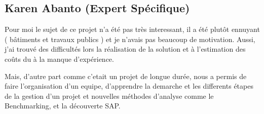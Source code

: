 \subsection{Karen Abanto (Expert Spécifique)}

Pour moi le sujet de ce projet n'a été pas très interessant, il a été plutôt
 ennuyant ( bâtiments et travaux publics )
et je n'avais pas beaucoup de motivation. Aussi, j'ai trouvé des 
difficultés lors la réalisation de la solution 
et à l'estimation des coûts du à la manque d'expérience. 

Mais, d'autre part comme c'etait un projet de longue durée, nous a permis de 
faire l'organisation d'un equipe, 
d'apprendre la demarche et les differents étapes de la gestion d'un projet 
et nouvelles méthodes d'analyse
comme le Benchmarking, et la découverte SAP.






